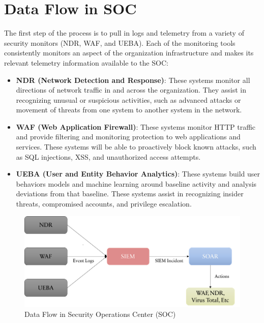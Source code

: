 \section{Data Flow in SOC}

The first step of the process is to pull in logs and telemetry from a variety of security monitors (NDR, WAF, and UEBA). Each of the monitoring tools consistently monitors an aspect of the organization infrastructure and makes its relevant telemetry information available to the SOC:

\begin{itemize}[itemsep=0pt,parsep=0pt,topsep=0pt,partopsep=0pt]
    \item \textbf{NDR (Network Detection and Response)}: These systems monitor all directions of network traffic in and across the organization. They assist in recognizing unusual or suspicious activities, such as advanced attacks or movement of threats from one system to another system in the network.
    \item \textbf{WAF (Web Application Firewall)}: These systems monitor HTTP traffic and provide filtering and monitoring protection to web applications and services. These systems will be able to proactively block known attacks, such as SQL injections, XSS, and unauthorized access attempts.
    \item \textbf{UEBA (User and Entity Behavior Analytics)}: These systems build user behaviors models and machine learning around baseline activity and analysis deviations from that baseline. These systems assist in recognizing insider threats, compromised accounts, and privilege escalation.
\end{itemize}

\begin{figure}[H]
    \centering
    \includegraphics[width=0.9\linewidth]{images/data_flow_soc.png}
    \caption{Data Flow in Security Operations Center (SOC)}
    \label{fig:data-flow-soc}
\end{figure}

